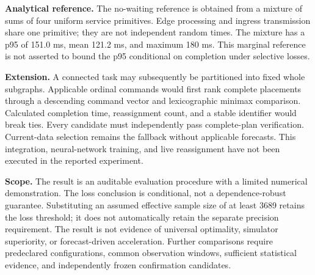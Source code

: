 \documentclass{psta}
\begin{document}
\textbf{Analytical reference.} The no-waiting reference is obtained from a mixture of sums of four uniform service primitives. Edge processing and ingress transmission share one primitive; they are not independent random times. The mixture has a p95 of 151.0 ms, mean 121.2 ms, and maximum 180 ms. This marginal reference is not asserted to bound the p95 conditional on completion under selective losses.

\textbf{Extension.} A connected task may subsequently be partitioned into fixed whole subgraphs. Applicable ordinal commands would first rank complete placements through a descending command vector and lexicographic minimax comparison. Calculated completion time, reassignment count, and a stable identifier would break ties. Every candidate must independently pass complete-plan verification. Current-data selection remains the fallback without applicable forecasts. This integration, neural-network training, and live reassignment have not been executed in the reported experiment.

\textbf{Scope.} The result is an auditable evaluation procedure with a limited numerical demonstration. The loss conclusion is conditional, not a dependence-robust guarantee. Substituting an assumed effective sample size of at least 3689 retains the loss threshold; it does not automatically retain the separate precision requirement. The result is not evidence of universal optimality, simulator superiority, or forecast-driven acceleration. Further comparisons require predeclared configurations, common observation windows, sufficient statistical evidence, and independently frozen confirmation candidates.
\end{document}
